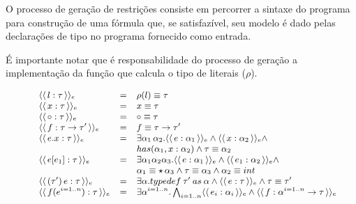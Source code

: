 \documentclass[a4paper,8pt]{article}
\newcommand{\constre}[1]{\ensuremath{\langle\langle\,#1\,\rangle\rangle_{e}}}
\begin{document}
     O processo de geração de restrições consiste em percorrer a
     sintaxe do programa para construção de uma fórmula que, se
     satisfazível, seu modelo é dado pelas declarações de tipo
     no programa fornecido como entrada. 

     É importante notar que é responsabilidade
     do processo de geração a implementação da função que calcula o
     tipo de literais ($\rho$).


     \begin{figure}[h]
       \[\small{
            \begin{array}{lcl}
                \constre{l : \tau} & = & \rho(l) \equiv \tau\\
                \constre{x : \tau} & = & x \equiv \tau \\
                \constre{\circ : \tau} & = & \circ \equiv \tau \\
                \constre{f : \tau\to \tau'} & = & f \equiv
                                                        \tau\to
                                                        \tau' \\
                \constre{e.x : \tau} & = & \exists
                                          \alpha_1\,\alpha_2. \constre{e
                                          : \alpha_1} \land \constre{x
                                          : \alpha_2} \land \\
                          & & has(\alpha_1,x:\alpha_2) \land \tau
                              \equiv \alpha_2\\
                \constre{e[e_1] : \tau} & = & \exists
                                         \alpha_1\alpha_2\alpha_3. \constre{e:\alpha_1}
                                             \land\constre{e_1: \alpha_2}\land\\
                         & & \alpha_1\equiv\star\,\alpha_3 \land \tau
                             \equiv\alpha_3 \land \alpha_2 \equiv int\\
                \constre{(\tau')\,e:\tau} & = & \exists \alpha. typedef\:\tau'\:as\:\alpha\land\constre{e : \tau} \land
                                               \tau \equiv \tau'\\
                \constre{f(e^{i=1..n}) : \tau} & = & \exists
                                                    \alpha^{i=1..n}. \bigwedge_{i=1..n}\constre{e_i:\alpha_i}
                                                    \land \constre{f :
                                                    \alpha^{i=1..n}
                                                    \to \tau} \\

\end{array}}\]
\end{figure}
\end{document}

